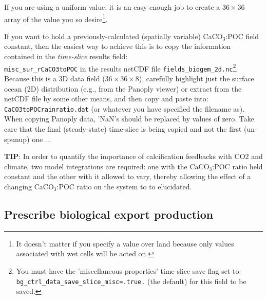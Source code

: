 If you are using a uniform value, it is an easy enough job to create a \begin{math}36\times36\end{math} array of the value you so desire\footnote{It doesn't matter if you specify a value over land because only values associated with wet cells will be acted on.}.

If you want to hold a previously-calculated (spatially variable) CaCO\begin{math}_3\end{math}:POC field constant, then the easiest way to achieve this is to copy the information contained in the \textit{time-slice} results field:\\
\texttt{misc\_sur\_rCaCO3toPOC} in the results netCDF file \texttt{fields\_biogem\_2d.nc}\footnote{You must have the 'miscellaneous properties' time-slice save flag set to:\\
\texttt{bg\_ctrl\_data\_save\_slice\_misc=.true.} (the default) for this field to be saved.}. Because this is a 3D data field (\begin{math}36\times36\times8\end{math}), carefully highlight just the surface ocean (2D) distribution (e.g., from the Panoply viewer) or extract from the netCDF file by some other means, and then copy and paste into:\\
\texttt{CaCO3toPOCrainratio.dat} (or whatever you have specified the filename as). When copying Panoply data, 'NaN's should be replaced by values of zero. Take care that the final (steady-state) time-slice is being copied and not the first (un-spunup) one ...

\vspace{1mm}
\textbf{TIP}: In order to quantify the importance of calcification feedbacks with CO2 and climate, two model integrations are required: one with the CaCO\begin{math}_3\end{math}:POC ratio held constant and the other with it allowed to vary, thereby allowing the effect of a changing CaCO\begin{math}_3\end{math}:POC ratio on the system to to elucidated.

%
\newpage
\subsection*{Prescribe biological export production}
\vspace{1mm}

